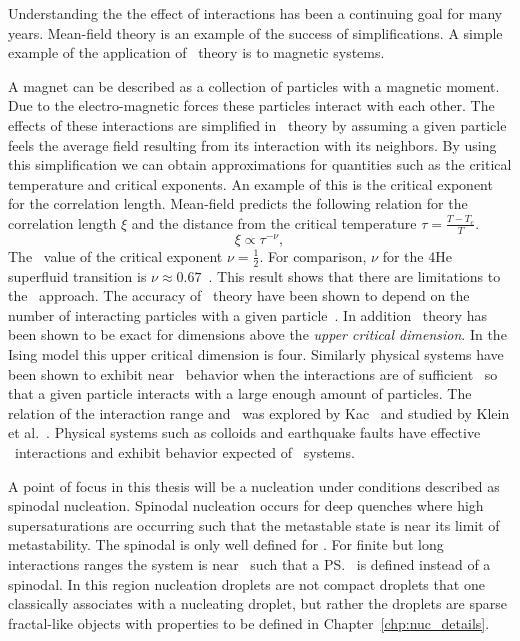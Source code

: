 Understanding the the effect of interactions has been a continuing goal for many years. Mean-field theory is an example of the success of simplifications. A simple example of the application of \mf\ theory is to magnetic systems. 

A magnet can be described as a collection of particles with a magnetic moment. Due to the electro-magnetic forces these particles interact with each other. The effects of these interactions are simplified in \mf\ theory by assuming a given particle feels the average field resulting from its interaction with its neighbors. By using this simplification we can obtain approximations for quantities such as the critical temperature and critical exponents. An example of this is the critical exponent for the correlation length. Mean-field predicts the following relation for the correlation length $\xi$ and the distance from the critical temperature $\tau=\frac{T-T_c}{T}$. %
\begin{equation}
\xi \propto \tau^{-\nu},
\end{equation}
The \mf\ value of the critical exponent $\nu = \frac{1}{2}$.  For comparison, $\nu$ for the 4He superfluid transition is $\nu \approx 0.67$~\cite{lipa03}. This result shows that there are limitations to the \mf\ approach. The accuracy of \mf\ theory have been shown to depend on the number of interacting particles with a given particle~\cite{penleb}. In addition \mf\ theory has been shown to be exact for dimensions above the \textit{upper critical dimension}. In the Ising model this upper critical dimension is four. Similarly physical systems have been shown to exhibit near \mf\ behavior when the interactions are of sufficient \lr\ so that a given particle interacts with a large enough amount of particles. The relation of the interaction range and \mf\ was explored by Kac~\cite{kac} and studied by Klein et al.~\cite{klein07}. Physical systems such as colloids and earthquake faults have effective \lr\ interactions and exhibit behavior expected of \mf\ systems.

A point of focus in this thesis will be a nucleation under conditions described as spinodal nucleation. Spinodal nucleation occurs for deep quenches where high supersaturations are occurring such that the metastable state is near its limit of metastability. The spinodal  is only well defined for \mf. For finite but long interactions ranges the system is near \mf\ such that a \ps\ is defined instead of a spinodal. In this region nucleation droplets are not compact droplets that one classically associates with a nucleating droplet, but rather the droplets are sparse fractal-like objects with properties to be defined in Chapter~\ref{chp:nuc_details}. 

